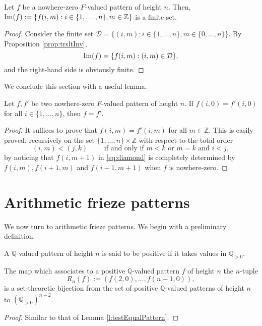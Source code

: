 \begin{corollary}
    \label{cor:imageFinite}
    Let $f$ be a nowhere-zero $F$-valued pattern of height $n$. Then, ${\rm Im}(f) := \{f (i,m) : i \in \{1,\ldots, n\}, m \in \mathbb{Z}\}$ is
    a finite set. 
\end{corollary}
\begin{proof}
    Consider the finite set $\mathcal{D} = \{(i,m) : i \in \{1,\ldots, n\}, m \in \{0,\ldots, n\}\}$. By Proposition \ref{prop:trsltInv}, 
    \[
        {\rm Im}(f) = \{f (i,m) : (i,m) \in \mathcal{D}\},
    \]
    and the right-hand side is obviously finite. 
\end{proof}

We conclude this section with a useful lemma.
\begin{lemma}
    \label{l:testEqualPattern}
    Let $f,f'$ be two nowhere-zero $F$-valued pattern of height $n$. If $f (i,0) = f' (i,0)$ for all $i \in \{1,\ldots, n\}$, then $f = f'$.
\end{lemma}
\begin{proof}
    It suffices to prove that $f (i,m) = f '(i,m)$ for all $m \in \mathbb{Z}$. This is easily proved, recursively on the set 
    $\{1,\ldots, n\} \times \mathbb{Z}$ with respect to the total order 
    \[
        (i,m) < (j,k) \qquad \text{ if and only if } m < k \text{ or } m=k \text{ and } i < j,
    \]
    by noticing that $f(i,m+1)$ in \eqref{eq:diamond} is completely determined by $f(i,m), f (i+1,m)$ and $f (i-1,m+1)$ when 
    $f$ is nowhere-zero.  
\end{proof}

\section{Arithmetic frieze patterns}
We now turn to arithmetic frieze patterns. We begin with a preliminary definition.

\begin{definition} 
    \label{def:positivePattern}
    A $\mathbb{Q}$-valued pattern of height $n$ is said to be positive if it takes values in $\mathbb{Q}_{>0}$.
\end{definition}


\begin{lemma}
    \label{l:positivePatternCharact}
    The map which associates to a positive $\mathbb{Q}$-valued pattern $f$ of height $n$ the $n$-tuple 
    \[
       R_n(f) :=  (f (2,0), \ldots, f(n-1,0)),
    \]
    is a set-theoretic bijection from the set of positive $\mathbb{Q}$-valued patterns of height $n$ to 
    $(\mathbb{Q}_{>0})^{n-2}$. 
\end{lemma}
\begin{proof}
    Similar to that of Lemma \ref{l:testEqualPattern}.
\end{proof}


